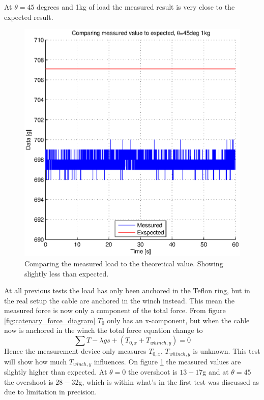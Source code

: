 At $\theta=45$ degrees and 1kg of load the measured result is very close to the expected result.

\begin{figure}[H]
\centering
\includegraphics[scale=0.75]{graphics/gcs_test/45degTheta1kg.eps}
\caption{Comparing the measured load to the theoretical value. Showing slightly less than expected.}
\label{fig:45degTheta1kg}
\end{figure}

\noindent
At all previous tests the load has only been anchored in the Teflon ring, but in the real setup the cable are anchored in the winch instead. This mean the measured force is now only a component of the total force. From figure \ref{fig:catenary_force_diagram} $T_0$ only has an x-component, but when the cable now is anchored in the winch the total force equation change to
\begin{equation}
\sum T -\lambda gs + (T_{0,x} + T_{whinch,y} ) = 0
\end{equation}
Hence the measurement device only measures $T_{0,x}$, $T_{whinch,y}$ is unknown. This test will show how much $T_{winch,y}$ influences.
On figure \ref{fig:45degTheta1kg} the measured values are slightly higher than expected. At $\theta = 0$ the overshoot is $13-17$g and at $\theta = 45$ the overshoot is $28-32$g, which is within what's in the first test was discussed as due to limitation in precision. 

